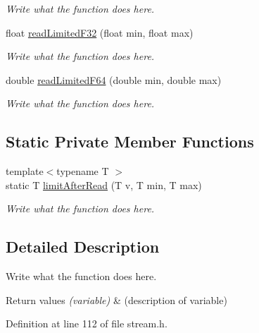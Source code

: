 \begin{DoxyCompactItemize}
\begin{DoxyCompactList}\small\item\em Write what the function does here. \end{DoxyCompactList}\item 
float \hyperlink{classReader_a0c4eba7401b90707776da4bab6b70d7c}{read\+Limited\+F32} (float min, float max)
\begin{DoxyCompactList}\small\item\em Write what the function does here. \end{DoxyCompactList}\item 
double \hyperlink{classReader_adabaf7ac8d6e342b6204a3c60b5c428c}{read\+Limited\+F64} (double min, double max)
\begin{DoxyCompactList}\small\item\em Write what the function does here. \end{DoxyCompactList}\end{DoxyCompactItemize}
\subsection*{Static Private Member Functions}
\begin{DoxyCompactItemize}
\item 
{\footnotesize template$<$typename T $>$ }\\static T \hyperlink{classReader_a27b3ccb94cb90cff7a6d7eb06cbb0c5c}{limit\+After\+Read} (T v, T min, T max)
\begin{DoxyCompactList}\small\item\em Write what the function does here. \end{DoxyCompactList}\end{DoxyCompactItemize}


\subsection{Detailed Description}
Write what the function does here. 


\begin{DoxyRetVals}{Return values}
{\em (variable)} & (description of variable) \\
\hline
\end{DoxyRetVals}


Definition at line 112 of file stream.\+h.



